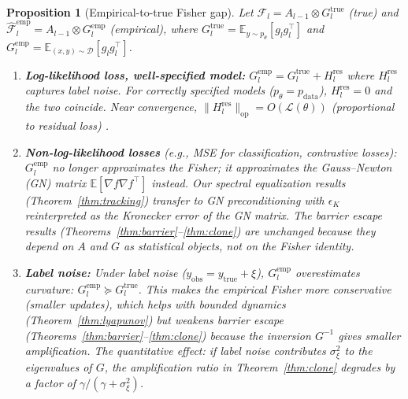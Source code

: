\documentclass{article}
\providecommand{\E}{\mathbb{E}}
\providecommand{\FIM}{\mathcal{F}}
\providecommand{\norm}[1]{\lVert #1 \rVert}
\theoremstyle{plain}
\newtheorem{proposition}{Proposition}
\theoremstyle{definition}
\theoremstyle{remark}
\begin{document}
\begin{proposition}[Empirical-to-true Fisher gap]
\label{prop:emp_fisher}
Let $\FIM_l = A_{l-1} \otimes G_l^{\mathrm{true}}$ (true) and $\hat{\FIM}_l^{\mathrm{emp}} = A_{l-1} \otimes G_l^{\mathrm{emp}}$ (empirical), where $G_l^{\mathrm{true}} = \E_{y \sim p_\theta}[g_l g_l^\top]$ and $G_l^{\mathrm{emp}} = \E_{(x,y) \sim \mathcal{D}}[g_l g_l^\top]$.
\begin{enumerate}
    \item[(i)] \textbf{Log-likelihood loss, well-specified model:} $G_l^{\mathrm{emp}} = G_l^{\mathrm{true}} + H_l^{\mathrm{res}}$ where $H_l^{\mathrm{res}}$ captures label noise. For correctly specified models ($p_\theta = p_{\mathrm{data}}$), $H_l^{\mathrm{res}} = 0$ and the two coincide. Near convergence, $\norm{H_l^{\mathrm{res}}}_{\mathrm{op}} = O(\mathcal{L}(\theta))$ (proportional to residual loss) \citep{kunstner2019limitations, martens2020ngd}.
    \item[(ii)] \textbf{Non-log-likelihood losses} (e.g., MSE for classification, contrastive losses): $G_l^{\mathrm{emp}}$ no longer approximates the Fisher; it approximates the \emph{Gauss--Newton} (GN) matrix $\E[\nabla f \nabla f^\top]$ instead. Our spectral equalization results (Theorem~\ref{thm:tracking}) transfer to GN preconditioning with $\epsilon_K$ reinterpreted as the Kronecker error of the GN matrix. The barrier escape results (Theorems~\ref{thm:barrier}--\ref{thm:clone}) are unchanged because they depend on $A$ and $G$ as statistical objects, not on the Fisher identity.
    \item[(iii)] \textbf{Label noise:} Under label noise ($y_{\mathrm{obs}} = y_{\mathrm{true}} + \xi$), $G_l^{\mathrm{emp}}$ overestimates curvature: $G_l^{\mathrm{emp}} \succeq G_l^{\mathrm{true}}$. This makes the empirical Fisher \emph{more conservative} (smaller updates), which \emph{helps} with bounded dynamics (Theorem~\ref{thm:lyapunov}) but \emph{weakens} barrier escape (Theorems~\ref{thm:barrier}--\ref{thm:clone}) because the inversion $G^{-1}$ gives smaller amplification. The quantitative effect: if label noise contributes $\sigma_\xi^2$ to the eigenvalues of $G$, the amplification ratio in Theorem~\ref{thm:clone} degrades by a factor of $\gamma/(\gamma + \sigma_\xi^2)$.
\end{enumerate}
\end{proposition}
\end{document}
